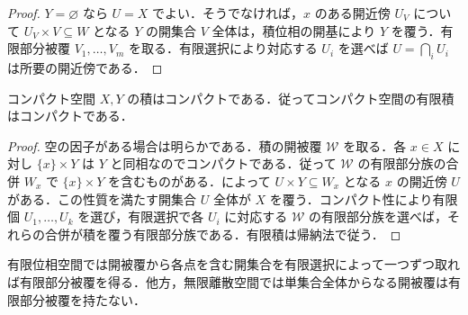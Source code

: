 \begin{proof}
$Y=\varnothing$ なら $U=X$ でよい．そうでなければ，$x$ のある開近傍 $U_V$ について $U_V\times V\subseteq W$ となる $Y$ の開集合 $V$ 全体は，積位相の開基により $Y$ を覆う．有限部分被覆 $V_1,\ldots,V_m$ を取る．有限選択により対応する $U_i$ を選べば $U=\bigcap_i U_i$ は所要の開近傍である．
\end{proof}
\begin{prop}[コンパクト空間の有限積]
コンパクト空間 $X,Y$ の積はコンパクトである．従ってコンパクト空間の有限積はコンパクトである．
\end{prop}
\begin{proof}
空の因子がある場合は明らかである．積の開被覆 $\mathcal W$ を取る．各 $x\in X$ に対し $\{x\}\times Y$ は $Y$ と同相なのでコンパクトである．従って $\mathcal W$ の有限部分族の合併 $W_x$ で $\{x\}\times Y$ を含むものがある．によって $U\times Y\subseteq W_x$ となる $x$ の開近傍 $U$ がある．この性質を満たす開集合 $U$ 全体が $X$ を覆う．コンパクト性により有限個 $U_1,\ldots,U_k$ を選び，有限選択で各 $U_i$ に対応する $\mathcal W$ の有限部分族を選べば，それらの合併が積を覆う有限部分族である．有限積は帰納法で従う．
\end{proof}
\begin{prop}[有限空間と無限離散空間]
有限位相空間では開被覆から各点を含む開集合を有限選択によって一つずつ取れば有限部分被覆を得る．他方，無限離散空間では単集合全体からなる開被覆は有限部分被覆を持たない．
\end{prop}
